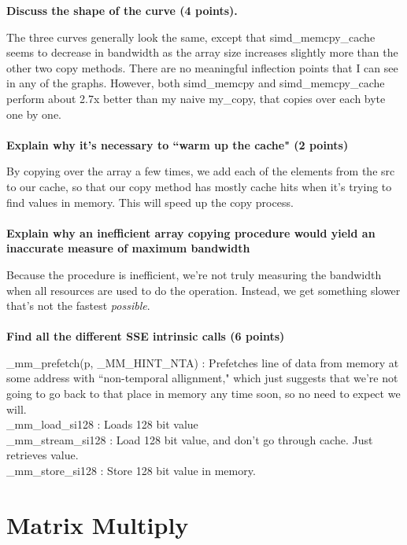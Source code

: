 \documentclass{article}
\begin{document}
\textbf{Discuss the shape of the curve (4 points).}

The three curves generally look the same, except that simd\_memcpy\_cache seems to decrease in bandwidth as the array size increases slightly more than the other two copy methods. There are no meaningful inflection points that I can see in any of the graphs. However, both simd\_memcpy and simd\_memcpy\_cache perform about 2.7x better than my naive my\_copy, that copies over each byte one by one.\\\\

\textbf{Explain why it's necessary to ``warm up the cache" (2 points)}

By copying over the array a few times, we add each of the elements from the src to our cache, so that our copy method has mostly cache hits when it's trying to find values in memory. This will speed up the copy process.\\\\

\textbf{Explain why an inefficient array copying procedure would yield an inaccurate measure of maximum bandwidth}

Because the procedure is inefficient, we're not truly measuring the bandwidth when all resources are used to do the operation. Instead, we get something slower that's not the fastest \textit{possible}.\\\\

\textbf{Find all the different SSE intrinsic calls (6 points)}

\_mm\_prefetch(p, \_MM\_HINT\_NTA) : Prefetches line of data from memory at some address with ``non-temporal allignment," which just suggests that we're not going to go back to that place in memory any time soon, so no need to expect we will.\\

\_mm\_load\_si128 : Loads 128 bit value\\

\_mm\_stream\_si128 : Load 128 bit value, and don't go through cache. Just retrieves value.\\

\_mm\_store\_si128 : Store 128 bit value in memory.

\section{Matrix Multiply}
\end{document}

